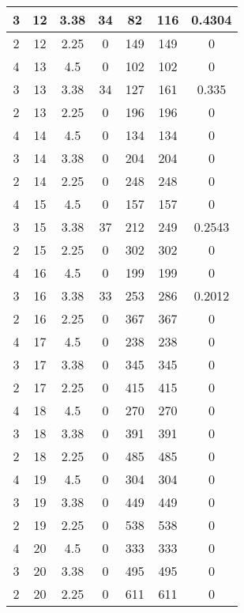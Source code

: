 \documentclass[letterpaper, 12pt]{article}
\begin{document}
\begin{longtable}{|c|c|c|c|c|c|c|}
\hline
3 & 12 & 3.38 & 34 & 82 & 116 & 0.4304 \\
\hline
2 & 12 & 2.25 & 0 & 149 & 149 & 0 \\
\hline
4 & 13 & 4.5 & 0 & 102 & 102 & 0 \\
\hline
3 & 13 & 3.38 & 34 & 127 & 161 & 0.335 \\
\hline
2 & 13 & 2.25 & 0 & 196 & 196 & 0 \\
\hline
4 & 14 & 4.5 & 0 & 134 & 134 & 0 \\
\hline
3 & 14 & 3.38 & 0 & 204 & 204 & 0 \\
\hline
2 & 14 & 2.25 & 0 & 248 & 248 & 0 \\
\hline
4 & 15 & 4.5 & 0 & 157 & 157 & 0 \\
\hline
3 & 15 & 3.38 & 37 & 212 & 249 & 0.2543 \\
\hline
2 & 15 & 2.25 & 0 & 302 & 302 & 0 \\
\hline
4 & 16 & 4.5 & 0 & 199 & 199 & 0 \\
\hline
3 & 16 & 3.38 & 33 & 253 & 286 & 0.2012 \\
\hline
2 & 16 & 2.25 & 0 & 367 & 367 & 0 \\
\hline
4 & 17 & 4.5 & 0 & 238 & 238 & 0 \\
\hline
3 & 17 & 3.38 & 0 & 345 & 345 & 0 \\
\hline
2 & 17 & 2.25 & 0 & 415 & 415 & 0 \\
\hline
4 & 18 & 4.5 & 0 & 270 & 270 & 0 \\
\hline
3 & 18 & 3.38 & 0 & 391 & 391 & 0 \\
\hline
2 & 18 & 2.25 & 0 & 485 & 485 & 0 \\
\hline
4 & 19 & 4.5 & 0 & 304 & 304 & 0 \\
\hline
3 & 19 & 3.38 & 0 & 449 & 449 & 0 \\
\hline
2 & 19 & 2.25 & 0 & 538 & 538 & 0 \\
\hline
4 & 20 & 4.5 & 0 & 333 & 333 & 0 \\
\hline
3 & 20 & 3.38 & 0 & 495 & 495 & 0 \\
\hline
2 & 20 & 2.25 & 0 & 611 & 611 & 0 \\
\hline
\end{longtable}
\end{document}
